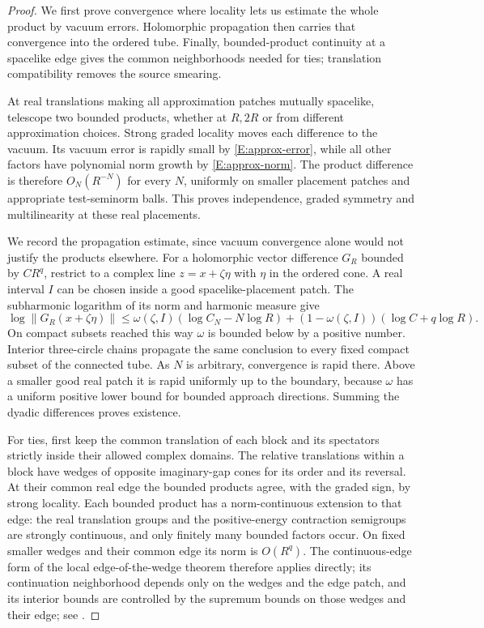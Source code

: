 \begin{proof}
We first prove convergence where locality lets us estimate the
whole product by vacuum errors.  Holomorphic propagation then carries
that convergence into the ordered tube.  Finally, bounded-product
continuity at a spacelike edge gives the common neighborhoods needed
for ties; translation compatibility removes the source smearing.

At real translations making all approximation patches mutually
spacelike, telescope two bounded products, whether at $R,2R$ or
from different approximation choices.  Strong graded locality moves
each difference to the vacuum.  Its vacuum error is rapidly small
by \eqref{E:approx-error}, while all other factors have polynomial
norm growth by \eqref{E:approx-norm}.  The product difference is
therefore $O_N(R^{-N})$ for every $N$, uniformly on smaller placement
patches and appropriate test-seminorm balls.  This proves independence,
graded symmetry and multilinearity at these real placements.

We record the propagation estimate, since vacuum convergence alone
would not justify the products elsewhere.  For a holomorphic vector
difference $G_R$ bounded by $CR^q$, restrict to a complex line
$z=x+\zeta\eta$ with $\eta$ in the ordered cone.  A real interval $I$
can be chosen inside a good spacelike-placement patch.  The
subharmonic logarithm of its norm and harmonic measure give
\begin{equation}\label{E:harmonic-propagation}
 \log\|G_R(x+\zeta\eta)\|
 \leq\omega(\zeta,I)(\log C_N-N\log R)
 +(1-\omega(\zeta,I))(\log C+q\log R).
\end{equation}
On compact subsets reached this way $\omega$ is bounded below by a
positive number.  Interior three-circle chains propagate the same
conclusion to every fixed compact subset of the connected tube.
As $N$ is arbitrary, convergence is rapid there.  Above a smaller
good real patch it is rapid uniformly up to the boundary, because
$\omega$ has a uniform positive lower bound for bounded approach
directions.  Summing the dyadic differences proves existence.

For ties, first keep the common translation of each block and its
spectators strictly inside their allowed complex domains.  The
relative translations within a block have wedges of opposite
imaginary-gap cones for its order and its reversal.  At their common
real edge the bounded products agree, with the graded sign, by
strong locality.  Each bounded product has a norm-continuous
extension to that edge: the real translation groups and the
positive-energy contraction semigroups are strongly continuous,
and only finitely many bounded factors occur.  On fixed smaller
wedges and their common edge its norm is $O(R^q)$.
The continuous-edge form of the local edge-of-the-wedge theorem
therefore applies directly; its continuation neighborhood depends
only on the wedges and the edge patch, and its interior bounds are
controlled by the supremum bounds on those wedges and their edge;
see \cite[Theorems~1$'$ and~2]{Browder1963}.


\end{proof}
